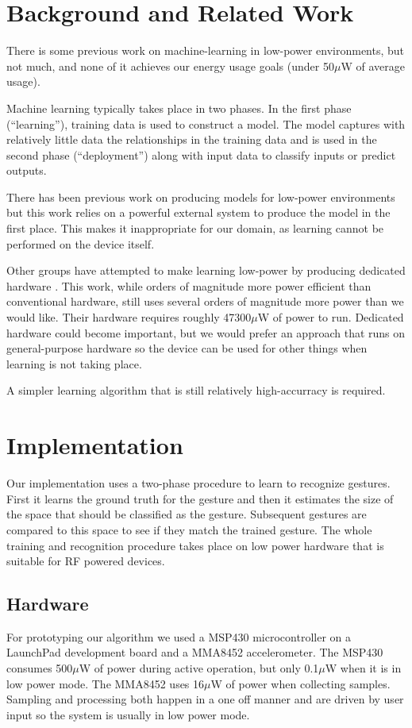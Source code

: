 \documentclass[12pt]{article}
\begin{document}
\section{Background and Related Work}

There is some previous work on machine-learning in low-power environments,
but not much, and none of it achieves our energy usage goals (under 50{$\mu$}W
of average usage).

Machine learning typically takes place in two phases. In the first phase
(``learning''), training data is used to construct a model. The model captures
with relatively little data the relationships in the training data and is used
in the second phase (``deployment'') along with input data to classify inputs
or predict outputs.

There has been previous work on producing models for low-power environments
\cite{low-power-models} but this work relies on a powerful external system to
produce the model in the first place. This makes it inappropriate for our
domain, as learning cannot be performed on the device itself.

Other groups have attempted to make learning low-power by producing dedicated
hardware \cite{ml-on-a-chip}. This work, while orders of magnitude more
power efficient than conventional hardware, still uses several
orders of magnitude more power than we would like. Their hardware requires
roughly 47300{$\mu$}W of power to run. Dedicated hardware could become
important, but we would prefer an approach that runs on general-purpose
hardware so the device can be used for other things when learning is not taking
place.

A simpler learning algorithm that is still relatively high-accurracy is
required.

\section{Implementation}
Our implementation uses a two-phase procedure to learn to recognize gestures. First it learns the ground truth for the gesture and then it estimates the size of the space that should be classified as the gesture. Subsequent gestures are compared to this space to see if they match the trained gesture. The whole training and recognition procedure takes place on low power hardware that is suitable for RF powered devices.

\subsection{Hardware}
For prototyping our algorithm we used a MSP430 microcontroller on a LaunchPad development board and a MMA8452 accelerometer. The MSP430 consumes 500{$\mu$}W of power during active operation, but only 0.1{$\mu$}W when it is in low power mode. The MMA8452 uses 16{$\mu$}W of power when collecting samples. Sampling and processing both happen in a one off manner and are driven by user input so the system is usually in low power mode.
\end{document}
